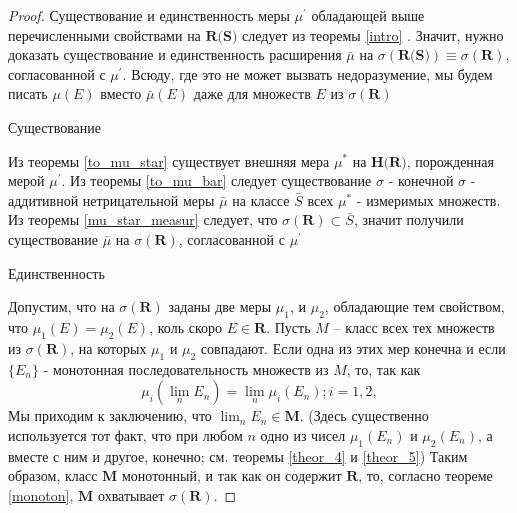 \begin{proof}

Существование и единственность меры $\mu^{'}$ обладающей выше перечисленными свойствами на $\textbf{R(S)}$ следует из теоремы \ref{intro} . Значит, нужно доказать существование и единственность расширения $\bar{\mu}$ на $\sigma(\textbf{R(S)}) \equiv \sigma(\textbf{R})$, согласованной с $\mu^{'}$. Всюду, где это не может вызвать недоразумение, мы будем писать $\mu(E)$ вместо $\bar{\mu}(E)$ даже для множеств $E$ из $\sigma(\textbf{R})$ 

Существование 

Из теоремы \ref{to_mu_star} существует внешняя мера $\mu^{*}$ на $\textbf{H(R)}$, порожденная мерой $\mu^{'}$. Из теоремы \ref{to_mu_bar} следует существование $\sigma$ - конечной $\sigma$ - аддитивной нетрицательной меры $\bar{\mu}$ на классе $\bar{S}$ всех $\mu^{*}$ - измеримых множеств. Из теоремы \ref{mu_star_measur} следует, что $\sigma({\textbf{R}}) \subset \bar{S}$, значит получили существование $\bar{\mu}$ на $\sigma({\textbf{R}})$, согласованной с $\mu^{'}$

Единственность

Допустим, что на $\sigma(\textbf{R})$ заданы две меры $\mu_1$, и $\mu_2$, обладающие тем свойством, что $\mu_1(E) = \mu_2(E)$, коль скоро $E \in \textbf{R}$. Пусть $M$ -- класс всех тех множеств из $\sigma(\textbf{R})$, на которых $\mu_1$ и $\mu_2$ совпадают. Если одна из этих мер конечна и если $\{E_n\}$ - монотонная последовательность множеств из $M$, то, так как 
$$
	\mu_i (\lim_n E_n) = \lim_n \mu_i(E_n); i = 1, 2, 
$$
Мы приходим к заключению, что $\lim_n E_n \in \textbf{M}$. (Здесь существенно используется тот факт, что при любом $n$ одно из чисел $\mu_1(E_n)$ и $\mu_2(E_n)$, а вместе с ним и другое, конечно; см. теоремы \ref{theor_4} и \ref{theor_5}) Таким образом, класс $\textbf{M}$ монотонный, и так как он содержит $\textbf{R}$, то, согласно теореме \ref{monoton}, $\textbf{M}$ охватывает $\sigma(\textbf{R})$. 

\end{proof}

